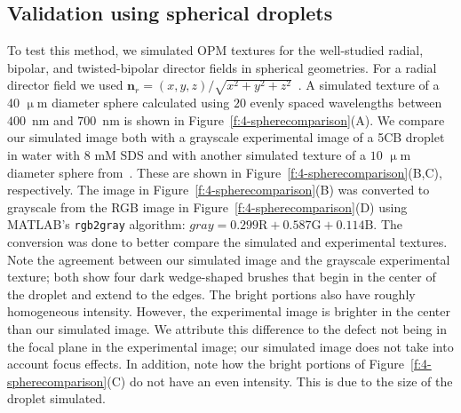 \subsection{Validation using spherical droplets}
To test this method, we simulated OPM textures for the well-studied radial, bipolar, and twisted-bipolar director fields in spherical geometries.
For a radial director field we used $\mathbf{n}_r = (x,y,z)/\sqrt{x^2+y^2+z^2}$~\cite{RN232}.
A simulated texture of a 40 $\upmu$m diameter sphere calculated using $20$ evenly spaced wavelengths between $400$~nm and $700$~nm is shown in Figure~\ref{f:4-spherecomparison}(A).
We compare our simulated image both with a grayscale experimental image of a 5CB droplet in water with 8 mM SDS and with another simulated texture of a $10$ $\upmu$m diameter sphere from~.
These are shown in Figure~\ref{f:4-spherecomparison}(B,C), respectively.
The image in Figure~\ref{f:4-spherecomparison}(B) was converted to grayscale from the RGB image in Figure~\ref{f:4-spherecomparison}(D) using MATLAB's \texttt{rgb2gray} algorithm: $gray = 0.299 \textrm{R} + 0.587 \textrm{G} + 0.114 \textrm{B}$.
The conversion was done to better compare the simulated and experimental textures.
Note the agreement between our simulated image and the grayscale experimental texture; both show four dark wedge-shaped brushes that begin in the center of the droplet and extend to the edges.
The bright portions also have roughly homogeneous intensity.
However, the experimental image is brighter in the center than our simulated image.
We attribute this difference to the defect not being in the focal plane in the experimental image; our simulated image does not take into account focus effects.
In addition, note how the bright portions of Figure~\ref{f:4-spherecomparison}(C) do not have an even intensity.
This is due to the size of the droplet simulated.

